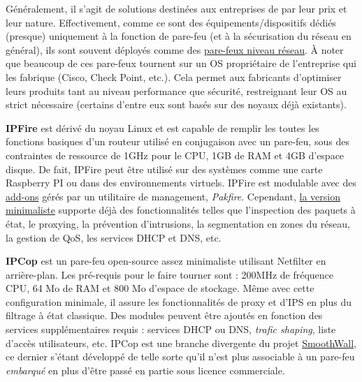 \documentclass[]{article}
\newcommand{\minit}[1]{\noindent{\small\textbf{ \underline{#1}}}\vspace{0.2cm}}
\begin{document}
\par Généralement, il s'agit de solutions destinées aux entreprises de par leur prix et leur nature. Effectivement, comme ce sont des équipements/dispositifs dédiés (presque) uniquement à la fonction de pare-feu (et à la sécurisation du réseau en général), ils sont souvent déployés comme des \hyperref[netw_fw]{pare-feux niveau réseau}. À noter que beaucoup de ces pare-feux tournent sur un OS propriétaire de l'entreprise qui les fabrique (Cisco, Check Point, etc.). Cela permet aux fabricants d'optimiser leurs produits tant au niveau performance que sécurité, restreignant leur OS au strict nécessaire (certains d'entre eux sont basés sur des noyaux déjà existants).\\

\minit{Appliances sur systèmes embarqués}

\par \textbf{IPFire} est dérivé du noyau Linux et est capable de remplir les toutes les fonctions basiques d'un routeur utilisé en conjugaison avec un pare-feu, sous des contraintes de ressource de 1GHz pour le CPU, 1GB de RAM et 4GB d'espace disque. De fait, IPFire peut être utilisé sur des systèmes comme une carte Raspberry PI ou dans des environnements virtuels. IPFire est modulable avec des \href{https://wiki.ipfire.org/addons/start}{add-ons} gérés par un utilitaire de management, \textit{Pakfire}. Cependant, \href{https://www.ipfire.org/features}{la version minimaliste} supporte déjà des fonctionnalités telles que l'inspection des paquets à état, le proxying, la prévention d'intrusions, la segmentation en zones du réseau, la gestion de QoS, les services DHCP et DNS, etc.\\

\par \textbf{IPCop} est un pare-feu open-source assez minimaliste utilisant Netfilter en arrière-plan. Les pré-requis pour le faire tourner sont : 200MHz de fréquence CPU, 64 Mo de RAM et 800 Mo d'espace de stockage. Même avec cette configuration minimale, il assure les fonctionnalités de proxy et d'IPS en plus du filtrage à état classique. Des modules peuvent être ajoutés en fonction des services supplémentaires requis : services DHCP ou DNS, \textit{trafic shaping}, liste d'accès utilisateurs, etc. IPCop est une branche divergente du projet \href{https://www.smoothwall.com/}{SmoothWall}, ce dernier s'étant développé de telle sorte qu'il n'est plus associable à un pare-feu \textit{embarqué} en plus d'être passé en partie sous licence commerciale.\\
\end{document}
